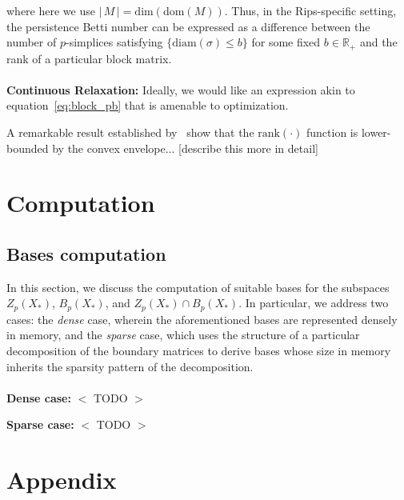 \documentclass[10pt]{article}
\begin{document}
where here we use $\lvert \, M \, \rvert = \mathrm{dim}(\mathrm{dom}(M))$. Thus, in the Rips-specific setting, the persistence Betti number can be expressed as a difference between the number of $p$-simplices satisfying $\{ \mathrm{diam}(\sigma) \leq b \}$ for some fixed $b \in \mathbb{R}_+$ and the rank of a particular block matrix. 
\\
\\
\noindent \textbf{Continuous Relaxation:} Ideally, we would like an expression akin to equation~\eqref{eq:block_pb} that is amenable to optimization.

A remarkable result established by~\cite{} show that the $\mathrm{rank}(\cdot)$ function is lower-bounded by the convex envelope... [describe this more in detail]

\section{Computation}
\subsection*{Bases computation}
In this section, we discuss the computation of suitable bases for the subspaces $Z_p(X_\ast)$, $B_p(X_\ast)$, and $Z_p(X_\ast) \cap B_p(X_\ast)$. In particular, we address two cases: the \emph{dense} case, wherein the aforementioned bases are represented densely in memory, and the \emph{sparse} case, which uses the structure of a particular decomposition of the boundary matrices to derive bases whose size in memory inherits the sparsity pattern of the decomposition.
\\
\\
\textbf{Dense case:} 
$<$ TODO $>$

\textbf{Sparse case:} 
$<$ TODO $>$

\appendix
\section{Appendix}
\end{document}
